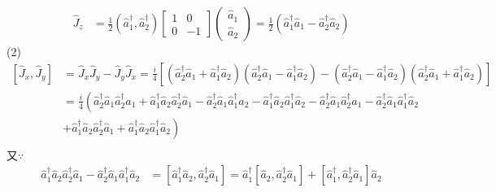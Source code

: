 \documentclass[12pt]{article}
\numberwithin{equation}{section}	 %
\begin{document}
\begin{spacing}{1.5}
\begin{equation}
\begin{aligned}
\hat{J}_{z} &= \frac{1}{2}\left(\hat{a}^{\dagger}_{1},\hat{a}^{\dagger}_{2}\right) \begin{bmatrix} 1 & 0 \\ 0 & -1 \end{bmatrix}\begin{pmatrix} \hat{a}_{1} \\ \hat{a}_{2} \end{pmatrix} = \frac{1}{2}(\hat{a}^{\dagger}_{1}\hat{a}_{1} - \hat{a}^{\dagger}_{2}\hat{a}_{2})
\end{aligned}
\end{equation}
(2)
\begin{equation}
\begin{aligned}
\left[ \hat{J}_{x},\hat{J}_{y} \right] &= \hat{J}_{x}\hat{J}_{y}-\hat{J}_{y}\hat{J}_{x} = \frac{i}{4} \left[(\hat{a}^{\dagger}_{2}\hat{a}_{1} + \hat{a}^{\dagger}_{1}\hat{a}_{2}) (\hat{a}^{\dagger}_{2}\hat{a}_{1} - \hat{a}^{\dagger}_{1}\hat{a}_{2}) - (\hat{a}^{\dagger}_{2}\hat{a}_{1} - \hat{a}^{\dagger}_{1}\hat{a}_{2}) (\hat{a}^{\dagger}_{2}\hat{a}_{1} + \hat{a}^{\dagger}_{1}\hat{a}_{2})\right]\\
&= \frac{i}{4} \left( { \hat{a}^{\dagger}_{2}\hat{a}_{1}\hat{a}^{\dagger}_{2}\hat{a}_{1} + \hat{a}^{\dagger}_{1}\hat{a}_{2}\hat{a}^{\dagger}_{2}\hat{a}_{1} - \hat{a}^{\dagger}_{2}\hat{a}_{1}\hat{a}^{\dagger}_{1}\hat{a}_{2} - \hat{a}^{\dagger}_{1}\hat{a}_{2}\hat{a}^{\dagger}_{1}\hat{a}_{2} - \hat{a}^{\dagger}_{2}\hat{a}_{1}\hat{a}^{\dagger}_{2}\hat{a}_{1} - \hat{a}^{\dagger}_{2}\hat{a}_{1}\hat{a}^{\dagger}_{1}\hat{a}_{2} } \right. \\
&\left. {+ \hat{a}^{\dagger}_{1}\hat{a}_{2}\hat{a}^{\dagger}_{2}\hat{a}_{1} + \hat{a}^{\dagger}_{1}\hat{a}_{2}\hat{a}^{\dagger}_{1}\hat{a}_{2} } \right)\\
\end{aligned}
\end{equation}
又$\because$\\
\begin{equation}
\begin{aligned}
\hat{a}^{\dagger}_{1}\hat{a}_{2}\hat{a}^{\dagger}_{2}\hat{a}_{1} - \hat{a}^{\dagger}_{2}\hat{a}_{1}\hat{a}^{\dagger}_{1}\hat{a}_{2} &= \left[ \hat{a}^{\dagger}_{1}\hat{a}_{2},\hat{a}^{\dagger}_{2}\hat{a}_{1} \right] = \hat{a}^{\dagger}_{1}\left[ \hat{a}_{2},\hat{a}^{\dagger}_{2}\hat{a}_{1} \right] + \left[ \hat{a}^{\dagger}_{1},\hat{a}^{\dagger}_{2}\hat{a}_{1} \right]\hat{a}_{2} \\

\end{aligned}
\end{equation}
\end{spacing}
\end{document}
